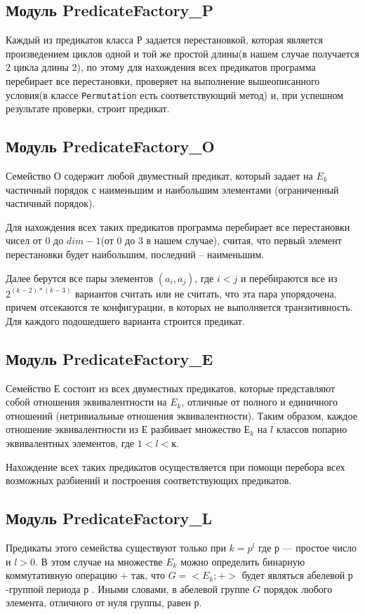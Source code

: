 \documentclass[a4paper,14pt]{extreport}
\begin{document}
\subsection{Модуль PredicateFactory\_P}
Каждый из предикатов класса $Р$ задается перестановкой, которая является произведением циклов одной и той же простой длины(в нашем случае получается $2$ цикла длины $2$), по этому для нахождения всех предикатов программа перебирает все перестановки, проверяет на выполнение вышеописанного условия(в классе {\tt Permutation} есть соответствующий метод) и, при успешном результате проверки, строит предикат.

\subsection{Модуль PredicateFactory\_O}
Семейство $О$ содержит любой двуместный предикат, который задает на $E_k$ частичный порядок с
наименьшим и наибольшим элементами (ограниченный частичный порядок). 

Для нахождения всех таких предикатов программа перебирает все перестановки чисел от $0$ до $dim-1$(от $0$ до $3$ в нашем случае), считая, что первый элемент перестановки будет наибольшим, последний – наименьшим. 

Далее берутся все пары элементов $(a_i,a_j)$, где $i<j$ и перебираются все из $2^{(k-2)*(k-3)}$ вариантов считать или не считать, что эта пара упорядочена, причем отсекаются те конфигурации, в которых не выполняется транзитивность. Для каждого подошедшего варианта строится предикат.

\subsection{Модуль PredicateFactory\_E}
Семейство $Е$ состоит из всех двуместных предикатов, которые  представляют собой отношения эквивалентности на $E_k$, отличные от полного и единичного отношений (нетривиальные отношения эквивалентности). Таким образом, каждое отношение эквивалентности из $Е$ разбивает множество $Е_k$ на $l$ классов попарно эквивалентных элементов, где $1 < l < к$. 

Нахождение всех таких предикатов осуществляется при помощи перебора всех возможных разбиений и построения соответствующих предикатов. 

\subsection{Модуль PredicateFactory\_L}
Предикаты этого семейства существуют только при $k = p^l$ где $р$ — простое число и $l > 0$. В этом случае на множестве $E_k$ можно определить бинарную коммутативную операцию $+$ так, 
что $G = <E_k;+>$ будет являться абелевой $р$-группой периода $р$ . Иными словами, в абелевой группе $G$ порядок любого элемента, отличного от нуля группы, равен $р$. 
\end{document}

